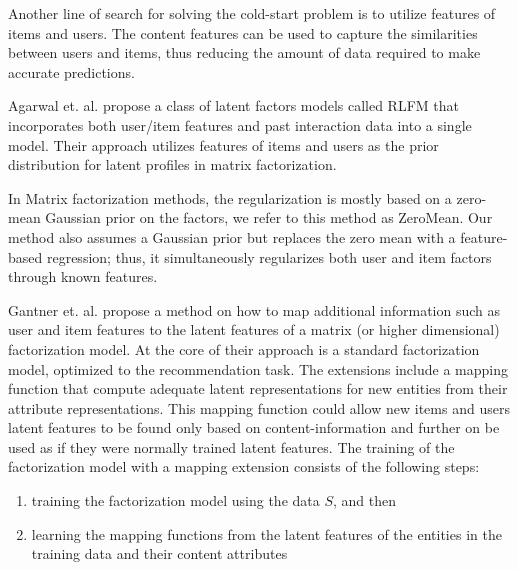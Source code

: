 Another line of search for solving the cold-start problem is to utilize features of items and users. The content features can be used to capture the similarities between users and items, thus reducing the amount of data required to make accurate predictions.


Agarwal et. al. \cite{Agarwal2009} propose a class of latent factors models called RLFM that incorporates both user/item features and past interaction data into a single model. Their approach utilizes features of items and users as the prior distribution for latent profiles in matrix factorization.

In Matrix factorization methods, the regularization is mostly based on a zero-mean Gaussian prior on the factors, we refer to this method as ZeroMean. Our method also assumes a Gaussian prior but replaces the zero mean with a feature-based regression; thus, it simultaneously regularizes both user and item factors through known features.


Gantner et. al. \cite{Ganter2010} propose a method on how to map additional information such as user and item features to the latent features of a matrix (or higher dimensional) factorization model. At the core of their approach is a standard factorization model, optimized to the recommendation task. The extensions include a mapping function that compute adequate latent representations for new entities from their attribute representations. This mapping function could allow new items and users latent features to be found only based on content-information and further on be used as if they were normally trained latent features. The training of the factorization model with a mapping extension consists of the following steps:

\begin{enumerate}
\item training the factorization model using the data $S$, and then
\item learning the mapping functions from the latent features of the entities in the training data and their content attributes
\end{enumerate}

